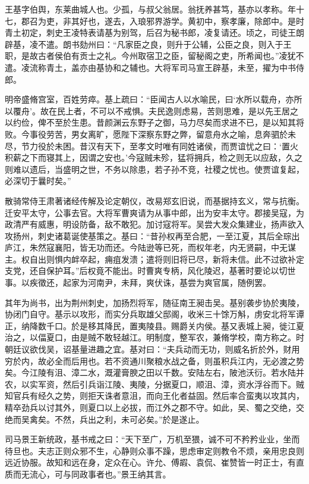 \documentclass[12pt,UTF8]{ctexbook}
\begin{document}
王基字伯舆，东莱曲城人也。少孤，与叔父翁居。翁抚养甚笃，基亦以孝称。年十七，郡召为吏，非其好也，遂去，入琅邪界游学。黄初中，察孝廉，除郎中。是时青土初定，刺史王凌特表请基为别驾，后召为秘书郎，凌复请还。顷之，司徒王朗辟基，凌不遣。朗书劾州曰：“凡家臣之良，则升于公辅，公臣之良，则入于王职，是故古者侯伯有贡士之礼。今州取宿卫之臣，留秘阁之吏，所希闻也。”凌犹不遣。凌流称青土，盖亦由基协和之辅也。大将军司马宣王辟基，未至，擢为中书侍郎。

明帝盛脩宫室，百姓劳瘁。基上疏曰：“臣闻古人以水喻民，曰‘水所以载舟，亦所以覆舟’。故在民上者，不可以不戒惧。夫民逸则虑易，苦则思难，是以先王居之以约俭，俾不至於生患。昔颜渊云东野子之御，马力尽矣而求进不已，是以知其将败。今事役劳苦，男女离旷，愿陛下深察东野之弊，留意舟水之喻，息奔驷於未尽，节力役於未困。昔汉有天下，至孝文时唯有同姓诸侯，而贾谊忧之曰：‘置火积薪之下而寝其上，因谓之安也。’今寇贼未殄，猛将拥兵，检之则无以应敌，久之则难以遗后，当盛明之世，不务以除患，若子孙不竞，社稷之忧也。使贾谊复起，必深切于曩时矣。”

散骑常侍王肃著诸经传解及论定朝仪，改易郑玄旧说，而基据持玄义，常与抗衡。迁安平太守，公事去官。大将军曹爽请为从事中郎，出为安丰太守。郡接吴寇，为政清严有威惠，明设防备，敌不敢犯。加讨寇将军。吴尝大发众集建业，扬声欲入攻扬州，刺史诸葛诞使基策之。基曰：“昔孙权再至合肥，一至江夏，其后全琮出庐江，朱然寇襄阳，皆无功而还。今陆逊等已死，而权年老，内无贤嗣，中无谋主。权自出则惧内衅卒起，痈疽发溃；遣将则旧将已尽，新将未信。此不过欲补定支党，还自保护耳。”后权竟不能出。时曹爽专柄，风化陵迟，基著时要论以切世事。以疾徵还，起家为河南尹，未拜，爽伏诛，基尝为爽官属，随例罢。

其年为尚书，出为荆州刺史，加扬烈将军，随征南王昶击吴。基别袭步协於夷陵，协闭门自守。基示以攻形，而实分兵取雄父邸阁，收米三十馀万斛，虏安北将军谭正，纳降数千口。於是移其降民，置夷陵县。赐爵关内侯。基又表城上昶，徙江夏治之，以偪夏口，由是贼不敢轻越江。明制度，整军农，兼脩学校，南方称之。时朝廷议欲伐吴，诏基量进趣之宜。基对曰：“夫兵动而无功，则威名折於外，财用穷於内，故必全而后用也。若不资通川聚粮水战之备，则虽积兵江内，无必渡之势矣。今江陵有沮、漳二水，溉灌膏腴之田以千数。安陆左右，陂池沃衍。若水陆并农，以实军资，然后引兵诣江陵、夷陵，分据夏口，顺沮、漳，资水浮谷而下。贼知官兵有经久之势，则拒天诛者意沮，而向王化者益固。然后率合蛮夷以攻其内，精卒劲兵以讨其外，则夏口以上必拔，而江外之郡不守。如此，吴、蜀之交绝，交绝而吴禽矣。不然，兵出之利，未可必矣。”於是遂止。

司马景王新统政，基书戒之曰：“天下至广，万机至猥，诚不可不矜矜业业，坐而待旦也。夫志正则众邪不生，心静则众事不躁，思虑审定则教令不烦，亲用忠良则远近协服。故知和远在身，定众在心。许允、傅嘏、袁侃、崔赞皆一时正士，有直质而无流心，可与同政事者也。”景王纳其言。
\end{document}
